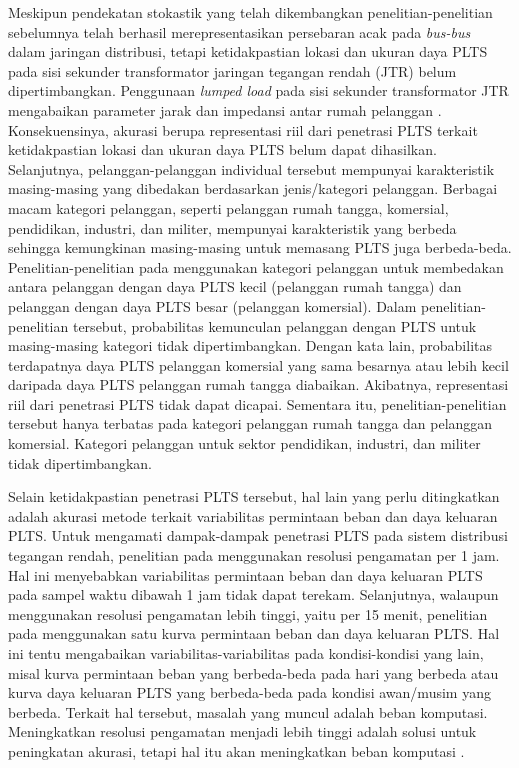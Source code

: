 Meskipun pendekatan stokastik yang telah dikembangkan penelitian-penelitian sebelumnya telah berhasil merepresentasikan persebaran acak pada \textit{bus-bus} dalam jaringan distribusi, tetapi ketidakpastian lokasi dan ukuran daya PLTS pada sisi sekunder transformator jaringan tegangan rendah (JTR) belum dipertimbangkan. Penggunaan \textit{lumped load} pada sisi sekunder transformator JTR mengabaikan parameter jarak dan impedansi antar rumah pelanggan \cite{Ding2017,Atmaja2019a,Atmaja2019b,Atmaja2020a}. Konsekuensinya, akurasi berupa representasi riil dari penetrasi PLTS terkait ketidakpastian lokasi dan ukuran daya PLTS belum dapat dihasilkan. Selanjutnya, pelanggan-pelanggan individual tersebut mempunyai karakteristik masing-masing yang dibedakan berdasarkan jenis/kategori pelanggan. Berbagai macam kategori pelanggan, seperti pelanggan rumah tangga, komersial, pendidikan, industri, dan militer, mempunyai karakteristik yang berbeda sehingga kemungkinan masing-masing untuk memasang PLTS juga berbeda-beda. Penelitian-penelitian pada \cite{Epri2012,Dubey2015} menggunakan kategori pelanggan untuk membedakan antara pelanggan dengan daya PLTS kecil (pelanggan rumah tangga) dan pelanggan dengan daya PLTS besar (pelanggan komersial). Dalam penelitian-penelitian tersebut, probabilitas kemunculan pelanggan dengan PLTS untuk masing-masing kategori tidak dipertimbangkan. Dengan kata lain, probabilitas terdapatnya daya PLTS pelanggan komersial yang sama besarnya atau lebih kecil daripada daya PLTS pelanggan rumah tangga diabaikan. Akibatnya, representasi riil dari penetrasi PLTS tidak dapat dicapai. Sementara itu, penelitian-penelitian tersebut hanya terbatas pada kategori pelanggan rumah tangga dan pelanggan komersial. Kategori pelanggan untuk sektor pendidikan, industri, dan militer tidak dipertimbangkan. 

Selain ketidakpastian penetrasi PLTS tersebut, hal lain yang perlu ditingkatkan adalah akurasi metode terkait variabilitas permintaan beban dan daya keluaran PLTS. Untuk mengamati dampak-dampak penetrasi PLTS pada sistem distribusi tegangan rendah, penelitian pada \cite{Dubey2017} menggunakan resolusi pengamatan per 1 jam. Hal ini menyebabkan variabilitas permintaan beban dan daya keluaran PLTS pada sampel waktu dibawah 1 jam tidak dapat terekam. Selanjutnya, walaupun menggunakan resolusi pengamatan lebih tinggi, yaitu per 15 menit, penelitian pada \cite{Torquato2018} menggunakan satu kurva permintaan beban dan daya keluaran PLTS. Hal ini tentu mengabaikan variabilitas-variabilitas pada kondisi-kondisi yang lain, misal kurva permintaan beban yang berbeda-beda pada hari yang berbeda atau kurva daya keluaran PLTS yang berbeda-beda pada kondisi awan/musim yang berbeda. Terkait hal tersebut, masalah yang muncul adalah beban komputasi. Meningkatkan resolusi pengamatan menjadi lebih tinggi adalah solusi untuk peningkatan akurasi, tetapi hal itu akan meningkatkan beban komputasi \cite{Beck2016}.

